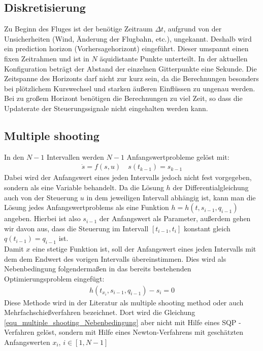 \subsection{Diskretisierung}
Zu Beginn des Fluges ist der benötige Zeitraum $\Delta t$, aufgrund von der Unsicherheiten (Wind, Änderung der Flugbahn, etc.), ungekannt. Deshalb wird ein prediction horizon (Vorhersagehorizont) eingeführt. Dieser umspannt einen fixen Zeitrahmen und ist in $N$ äquidistante Punkte unterteilt. In der aktuellen Konfiguration beträgt der Abstand der einzelnen Gitterpunkte eine Sekunde. Die Zeitspanne des Horizonts darf nicht zur kurz sein, da die Berechnungen besonders bei plötzlichem Kurswechsel und starken äußeren Einflüssen zu ungenau werden. Bei zu großem Horizont benötigen die Berechnungen zu viel Zeit, so dass die Updaterate der Steuerungssignale nicht eingehalten werden kann. 
\subsection{Multiple shooting}
In den $N - 1$ Intervallen werden $N - 1$ Anfangswertprobleme gelöst mit:
\begin{align}
	\dot{s} = f(s, u) \hspace{1em} s(t_{k-1}) = s_{k-1}
\end{align}
Dabei wird der Anfangswert eines jeden Intervalls jedoch nicht fest vorgegeben, sondern als eine Variable behandelt. Da die Lösung \(h\) der Differentialgleichung auch von der Steuerung \(u\) in dem jeweiligen Intervall abhängig ist, kann man die Lösung jedes Anfangswertproblems als eine Funktion \(h=h(t,s_{i-1},q_{i-1})\) angeben. Hierbei ist also \( s_{i-1}\) der Anfangswert als Parameter, außerdem gehen wir davon aus, dass die Steuerung im Intervall \([t_{i-1},t_i]\) konstant gleich \(q(t_{i-1})=q_{i-1}\) ist.\\
Damit \(x\) eine stetige Funktion ist, soll der Anfangswert eines jeden Intervalls mit dem dem Endwert des vorigen Intervalls übereinstimmen. Dies wird als Nebenbedingung folgendermaßen in das bereits bestehenden Optimierungsproblem eingefügt:
\begin{align}
	h(t_{x_i},s_{i-1},q_{i-1}) - s_{i} = 0
	\label{equ_multiple_shooting_Nebenbedingung}
\end{align}
Diese Methode wird in der Literatur \cite{bulirsch2005} als multiple shooting method oder auch Mehrfachschießverfahren bezeichnet. Dort wird die Gleichung \ref{equ_multiple_shooting_Nebenbedingung} aber nicht mit Hilfe eines SQP - Verfahren gelöst, sondern mit Hilfe eines Newton-Verfahrens mit geschätzten Anfangswerten $x_i$, $i \in [1, N-1]$
